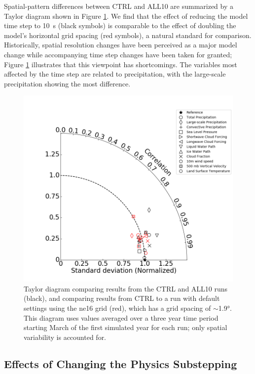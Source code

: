 \documentclass [11pt, proquest] {uwthesis}[2020/02/24]
\begin{document}
Spatial-pattern differences between CTRL and ALL10 are summarized by a Taylor diagram shown in Figure \ref{fig:taylor}. We find that the effect of reducing the model time step to \SI{10}{\second} (black symbols) is comparable to the effect of doubling the model's horizontal grid spacing (red symbols), a natural standard for comparison. Historically, spatial resolution changes have been perceived as a major model change while accompanying time step changes have been taken for granted; Figure \ref{fig:taylor} illustrates that this viewpoint has shortcomings. The variables most affected by the time step are related to precipitation, with the large-scale precipitation showing the most difference.

\begin{figure}
    \centering
    \includegraphics[width=5.5in]{Figure6.png}
    \caption{Taylor diagram comparing results from the CTRL and ALL10 runs (black), and comparing results from CTRL to a run with default settings using the ne16 grid (red), which has a grid spacing of $\sim$\ang{1.9}. This diagram uses values averaged over a three year time period starting March of the first simulated year for each run; only spatial variability is accounted for.}
    \label{fig:taylor}
\end{figure}

\subsection{Effects of Changing the Physics Substepping}
\end{document}
